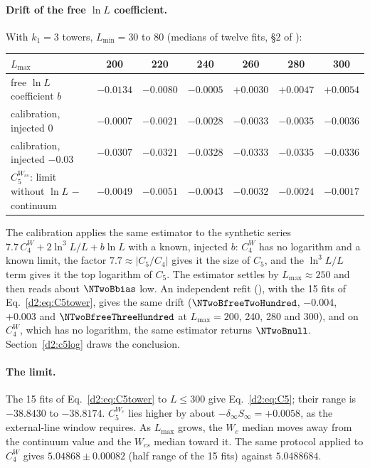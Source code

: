 \paragraph{Drift of the free $\ln L$ coefficient.} With $k_1=3$ towers, $L_{\min}=30$ to 80 (medians of twelve fits,
\S2 of ):
\begin{center}\footnotesize\renewcommand{\arraystretch}{1.15}
\begin{tabular}{@{}lcccccc@{}}
\toprule
$L_{\max}$ & 200 & 220 & 240 & 260 & 280 & 300 \\\midrule
free $\ln L$ coefficient $b$ & $-0.0134$ & $-0.0080$ & $-0.0005$ & $+0.0030$ & $+0.0047$ & $+0.0054$ \\
calibration, injected $0$ & $-0.0007$ & $-0.0021$ & $-0.0028$ & $-0.0033$ & $-0.0035$ & $-0.0036$ \\
calibration, injected $-0.03$ & $-0.0307$ & $-0.0321$ & $-0.0328$ & $-0.0333$ & $-0.0335$ & $-0.0336$ \\
$C_5^{W_{cs}}$: limit without $\ln L$ $-$ continuum & $-0.0049$ & $-0.0051$ & $-0.0043$ & $-0.0032$ & $-0.0024$ & $-0.0017$ \\
\bottomrule
\end{tabular}
\end{center}
The calibration applies the same estimator to the synthetic series $7.7\,C_4^W+2\ln^3L/L+b\ln L$ with a known, injected $b$:
$C_4^W$ has no logarithm and a known limit, the factor $7.7\approx|C_5/C_4|$ gives it the size of $C_5$, and the
$\ln^3L/L$ term gives it the top logarithm of $C_5$. The estimator settles by $L_{\max}\approx250$ and then reads about
$\NTwoBbias$ low. An independent refit (), with the 15 fits of Eq.~\eqref{d2:eq:C5tower}, gives the
same drift ($\NTwoBfreeTwoHundred$, $-0.004$, $+0.003$ and
$\NTwoBfreeThreeHundred$ at $L_{\max}=200$, 240, 280 and 300), and on $C_4^W$, which has no logarithm, the same estimator
returns $\NTwoBnull$. Section~\ref{d2:c5log} draws the conclusion.

\paragraph{The limit.} The 15 fits of Eq.~\eqref{d2:eq:C5tower} to $L\le300$ give Eq.~\eqref{d2:eq:C5}; their range is
$-38.8430$ to $-38.8174$. $C_5^{W_c}$ lies higher by about $-\delta_\infty S_\infty=+0.0058$, as the external-line window
requires. As $L_{\max}$ grows, the $W_c$ median moves away from the continuum value and the $W_{cs}$ median toward it. The
same protocol applied to $C_4^W$ gives $5.04868\pm0.00082$ (half range of the 15 fits) against $5.0488684$.

